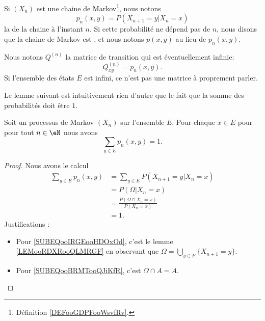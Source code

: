 \begin{definition}      \label{DEFooVVWUooKIBQDv}
	Si \( (X_n)\) est une chaine de Markov\footnote{Définition \ref{DEFooGDPFooWsvfRv}.}, nous notons
	\begin{equation}
		p_n(x,y)=P(X_{n+1}=y|X_n=x)
	\end{equation}
	la  de la chaine à l'instant \( n\). Si cette probabilité ne dépend pas de \( n\), nous disons que la chaine de Markov est , et nous notons \( p(x,y)\) au lieu de \( p_n(x,y)\).
\end{definition}

\begin{definition}       \label{DEFooKQROooYvJvvl}
	Nous notons \( Q^{(n)}\) la matrice de transition qui est éventuellement infinie:
	\begin{equation}
		Q^{(n)}_{xy}=p_n(x,y).
	\end{equation}
	Si l'ensemble des états \( E\) est infini, ce n'est pas une matrice à proprement parler.
\end{definition}

Le lemme suivant est intuitivement rien d'autre que le fait que la somme des probabilités doit être \( 1\).
\begin{lemma}       \label{LEMooQNIWooQBMlge}
	Soit un processus de Markov \( (X_n)\) sur l'ensemble \( E\). Pour chaque \( x\in E\) pour pour tout \( n\in \eN\) nous avons
	\begin{equation}
		\sum_{y\in E}p_n(x,y)=1.
	\end{equation}
\end{lemma}

\begin{proof}
	Nous avons le calcul
	\begin{subequations}
		\begin{align}
			\sum_{y\in E}p_n(x,y) & =\sum_{y\in E}P(X_{n+1}=y|X_n=x)                      \\
			                      & =  P(\Omega|X_n=x)        \label{SUBEQooIRGEooHDOxOd} \\
			                      & =\frac{ P(\Omega\cap X_n=x) }{ P(X_n=x) }             \\
			                      & =1\label{SUBEQooBRMTooQJiKfR}.
		\end{align}
	\end{subequations}
	Justifications :
	\begin{itemize}
		\item Pour \eqref{SUBEQooIRGEooHDOxOd}, c'est le lemme \ref{LEMooRDXRooQLMRGF} en observant que \( \Omega=\bigcup_{y\in E}\{ X_{n+1}=y \}\).
		\item Pour \eqref{SUBEQooBRMTooQJiKfR}, c'est \( \Omega\cap A=A\).
	\end{itemize}
\end{proof}

